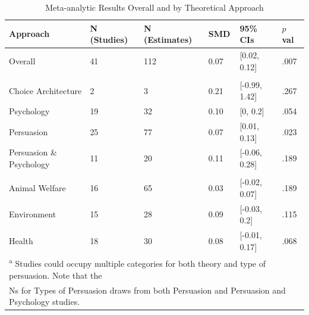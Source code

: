 \documentclass[sn-nature,referee,pdflatex]{sn-jnl}
\begin{document}
\begin{table}[!ht]
\centering
\caption{\label{tab:table_one}Meta-analytic Results Overall and by Theoretical Approach}
\centering
\begin{tabular}[t]{llllll}
\toprule
Approach & N (Studies) & N (Estimates) & SMD & 95\% CIs & $p$ val\\
\midrule
Overall & 41 & 112 & 0.07 & {}[0.02, 0.12] & .007\\
\addlinespace[0.5em]
\multicolumn{6}{l}{\textbf{Theory}}\\
\hspace{1em}Choice Architecture & 2 & 3 & 0.21 & {}[-0.99, 1.42] & .267\\
\hspace{1em}Psychology & 19 & 32 & 0.10 & {}[0, 0.2] & .054\\
\hspace{1em}Persuasion & 25 & 77 & 0.07 & {}[0.01, 0.13] & .023\\
\hspace{1em}Persuasion \& Psychology & 11 & 20 & 0.11 & {}[-0.06, 0.28] & .189\\
\addlinespace[0.5em]
\multicolumn{6}{l}{\textbf{Type of Persuasion}}\\
\hspace{1em}Animal Welfare & 16 & 65 & 0.03 & {}[-0.02, 0.07] & .189\\
\hspace{1em}Environment & 15 & 28 & 0.09 & {}[-0.03, 0.2] & .115\\
\hspace{1em}Health & 18 & 30 & 0.08 & {}[-0.01, 0.17] & .068\\
\bottomrule
\multicolumn{6}{l}{\textsuperscript{a} Studies could occupy multiple categories for both theory and type of persuasion. Note that the}\\
\multicolumn{6}{l}{Ns for Types of Persuasion draws from both Persuasion and Persuasion and Psychology studies.}\\
\end{tabular}
\end{table}
\end{document}
